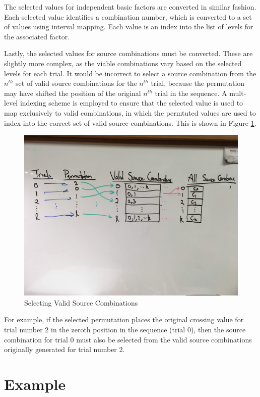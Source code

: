 The selected values for independent basic factors are converted in similar fashion. Each selected value identifies a combination number, which is converted to a set of values using interval mapping. Each value is an index into the list of levels for the associated factor.

Lastly, the selected values for source combinations must be converted. These are slightly more complex, as the viable combinations vary based on the selected levels for each trial. It would be incorrect to select a source combination from the $n^{th}$ set of valid source combinations for the $n^{th}$ trial, because the permutation may have shifted the position of the original $n^{th}$ trial in the sequence. A mult-level indexing scheme is employed to ensure that the selected value is used to map exclusively to valid combinations, in which the permtuted values are used to index into the correct set of valid source combinations. This is shown in Figure \ref{fig:source_combinations}.

\begin{figure}[t]
\centering
\centerline{\includegraphics[origin=c,width=12cm]{../figures/source-combinations.jpg}}
\caption{Selecting Valid Source Combinations}
\label{fig:source_combinations}
\end{figure}

For example, if the selected permutation places the original crossing value for trial number 2 in the zeroth position in the sequence (trial 0), then the source combination for trial 0 must also be selected from the valid source combinations originally generated for trial number 2.


\section{Example}

